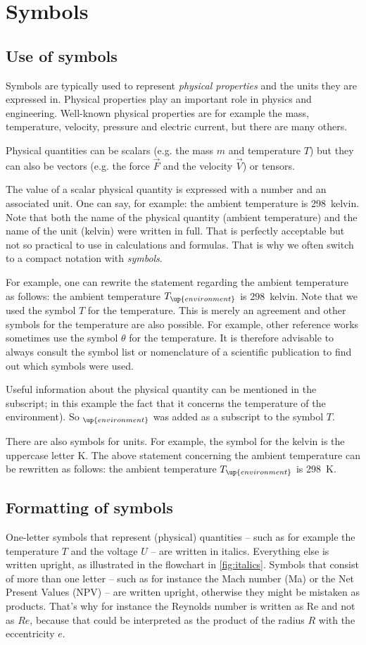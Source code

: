 \section{Symbols}\label{sec:formatsymbols}
\subsection{Use of symbols}
Symbols are typically used to represent \emph{physical properties} and the units they are expressed in. Physical properties play an important role in physics and engineering. Well-known physical properties are for example the mass, temperature, velocity, pressure and electric current, but there are many others.

Physical quantities can be scalars (e.g. the mass $m$ and temperature $T$) but they can also be vectors (e.g. the force $\vec{F}$ and the velocity $\vec{V}$) or tensors.

The value of a scalar physical quantity is expressed with a number and an associated unit. One can say, for example: the ambient temperature is 298~kelvin. Note that both the name of the physical quantity (ambient temperature) and the name of the unit (kelvin) were written in full. That is perfectly acceptable but not so practical to use in calculations and formulas. That is why we often switch to a compact notation with \emph{symbols}.

For example, one can rewrite the statement regarding the ambient temperature as follows: the ambient temperature $ T_\up{environment}$ is 298~kelvin. Note that we used the symbol $T$ for the temperature. This is merely an agreement and  other symbols for the temperature are also possible. For example, other reference works sometimes use the symbol $\theta$ for the temperature. It is therefore advisable to always consult the symbol list or nomenclature of a scientific publication to find out which symbols were used.

Useful information about the physical quantity can be mentioned in the subscript; in this example the fact that it concerns the temperature of the environment). So $_\up{environment}$ was added as a subscript to the symbol $T$.

There are also symbols for units. For example, the symbol for the kelvin is the uppercase letter K. The above statement concerning the ambient temperature can be rewritten as follows: the ambient temperature $T_\up{environment}$ is \SI{298}{\kelvin}.

\subsection{Formatting of symbols}
One-letter symbols that represent (physical) quantities -- such as for example the temperature $T$ and the voltage $U$ -- are written in italics. Everything else is written upright, as illustrated in the flowchart in \cref{fig:italics}.  Symbols that consist of more than one letter -- such as for instance the Mach number (Ma) or the Net Present Values (NPV) -- are written upright, otherwise they might be mistaken as products. That's why for instance the Reynolds number is written as Re and not as $Re$, because that could be interpreted as the product of the radius $R$ with the eccentricity $e$.

